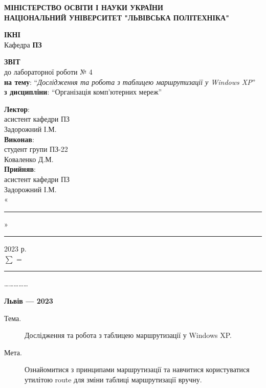 \documentclass{article}
\newcommand\subject{Організація комп’ютерних мереж}
\newcommand\lecturer{асистент кафедри ПЗ \\ Задорожний І.М.}
\newcommand\teacher{асистент кафедри ПЗ \\ Задорожний І.М.}
\newcommand\mygroup{ПЗ-22}
\newcommand\lab{4}
\newcommand\theme{Дослідження та робота з таблицею маршрутизації у Windows XP}
\newcommand\purpose{Ознайомитися з принципами маршрутизації та навчитися користуватися утилітою route для зміни таблиці маршрутизації вручну}
\begin{document}
\begin{normalsize}
	\begin{titlepage}
		\thispagestyle{empty}
		\begin{center}
			\textbf{МІНІСТЕРСТВО ОСВІТИ І НАУКИ УКРАЇНИ\\
				НАЦІОНАЛЬНИЙ УНІВЕРСИТЕТ "ЛЬВІВСЬКА ПОЛІТЕХНІКА"}
		\end{center}
		\begin{flushright}
			\textbf{ІКНІ}\\
			Кафедра \textbf{ПЗ}
		\end{flushright}
		\vspace{200pt}
		\begin{center}
			\textbf{ЗВІТ}\\
			\vspace{10pt}
			до лабораторної роботи № \lab\\
			\textbf{на тему}: “\textit{\theme}”\\
			\textbf{з дисципліни}: “\subject”
		\end{center}
		\vspace{112pt}
		\begin{flushright}
			
			\textbf{Лектор}:\\
			\lecturer\\
			\vspace{28pt}
			\textbf{Виконав}:\\
			
			студент групи \mygroup\\
			Коваленко Д.М.\\
			\vspace{28pt}
			\textbf{Прийняв}:\\
			
			\teacher\\
			
			\vspace{28pt}
			«\rule{1cm}{0.15mm}» \rule{1.5cm}{0.15mm} 2023 р.\\
			$\sum$ = \rule{1cm}{0.15mm}……………\\
			
		\end{flushright}
		\vspace{\fill}
		\begin{center}
			\textbf{Львів — 2023}
		\end{center}
	\end{titlepage}
		
	\begin{description}
		\item[Тема.] \theme.
		\item[Мета.] \purpose.
	\end{description}


\end{normalsize}
\end{document}
